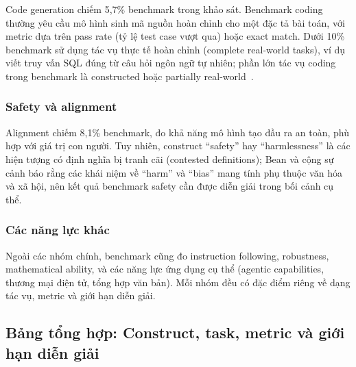 Code generation chiếm 5,7\% benchmark trong khảo sát. Benchmark coding thường yêu cầu mô hình sinh mã nguồn hoàn chỉnh cho một đặc tả bài toán, với metric dựa trên pass rate (tỷ lệ test case vượt qua) hoặc exact match. Dưới 10\% benchmark sử dụng tác vụ thực tế hoàn chỉnh (complete real-world tasks), ví dụ viết truy vấn SQL đúng từ câu hỏi ngôn ngữ tự nhiên; phần lớn tác vụ coding trong benchmark là constructed hoặc partially real-world~\cite{measuring_what_matters}.

\subsubsection{Safety và alignment}

Alignment chiếm 8,1\% benchmark, đo khả năng mô hình tạo đầu ra an toàn, phù hợp với giá trị con người. Tuy nhiên, construct ``safety'' hay ``harmlessness'' là các hiện tượng có định nghĩa bị tranh cãi (contested definitions); Bean và cộng sự~\cite{measuring_what_matters} cảnh báo rằng các khái niệm về ``harm'' và ``bias'' mang tính phụ thuộc văn hóa và xã hội, nên kết quả benchmark safety cần được diễn giải trong bối cảnh cụ thể.

\subsubsection{Các năng lực khác}

Ngoài các nhóm chính, benchmark cũng đo instruction following, robustness, mathematical ability, và các năng lực ứng dụng cụ thể (agentic capabilities, thương mại điện tử, tổng hợp văn bản). Mỗi nhóm đều có đặc điểm riêng về dạng tác vụ, metric và giới hạn diễn giải.

\subsection{Bảng tổng hợp: Construct, task, metric và giới hạn diễn giải}

\footnotesize
\setlength{\tabcolsep}{3pt}
\renewcommand{\arraystretch}{1.15}

